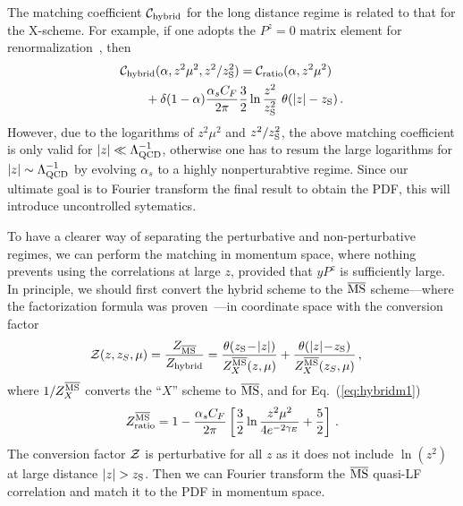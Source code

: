 \documentclass[preprint,12pt]{elsarticle}
\newcommand{\MS}{{\overline{\rm MS}}}
\newcommand{\nn}{\nonumber}
\DeclareRobustCommand{\eq}[1]{Eq.~(\ref{eq:#1})}
\begin{document}
The matching coefficient ${\cal C}_{\rm hybrid}$ for the long distance regime is related to that for the X-scheme. For example, if one adopts the $P^z=0$ matrix element for renormalization~\cite{Zhang:2018ggy,Radyushkin:2017lvu,Izubuchi:2018srq}, then
\begin{align}\label{eq:hybridm1}
&{\cal C}_{\rm hybrid}(\alpha, z^2\mu^2, z^2/z_{\rm S}^2) = {\cal C}_{\rm ratio}(\alpha, z^2\mu^2) \nn\\
&\qquad + \delta(1-\alpha){\alpha_sC_F\over 2\pi}{3\over 2} \ln {z^2\over z_{\rm S}^2}\ \theta(|z|-z_{\rm S})\,.
\end{align}
 However, due to the logarithms of $z^2\mu^2$ and $z^2/z_{\rm S}^2$, the above matching coefficient is only valid for $|z| \ll \Lambda_{\rm QCD}^{-1}$, otherwise one has to resum the large logarithms for $|z|\sim \Lambda_{\rm QCD}^{-1}$ by evolving $\alpha_s$ to a highly nonperturabtive regime. Since our ultimate goal is to Fourier transform the final result to obtain the PDF, this will introduce uncontrolled sytematics.

To have a clearer way of separating the perturbative and non-perturbative regimes, we can perform the matching in momentum space, where nothing prevents using the correlations at large $z$, provided that $yP^z$ is sufficiently large. In principle, we should first convert the hybrid scheme to the $\MS$ scheme---where the factorization formula was proven~\cite{Ma:2014jla,Ji:2020ect}---in coordinate space with the conversion factor
\begin{align}\label{eq:hybrid3}
    {\cal Z}(z,z_S,\mu) & = {Z_{\MS}\over Z_{\rm hybrid}} =\frac{\theta(z_{\rm S}\!-\!|z|)}{Z^{\overline{\rm MS}}_{X}(z,\mu)}
    +\frac{\theta(|z|\!-\! z_{\rm S})}{Z^{\overline{\rm MS}}_{X}(z_S,\mu)}\,,
\end{align}
where $1/Z^{\overline{\rm MS}}_{X}$ converts the ``$X$'' scheme to $\MS$, and for \eq{hybridm1}
\begin{align}\label{eq:zmsr}
    Z^{\overline{\rm MS}}_{\rm ratio} = 1 - {\alpha_sC_F\over 2\pi}\left[{3\over 2}\ln{z^2\mu^2\over 4e^{-2\gamma_E}}+ {5\over2}\right]\,.
\end{align}
The conversion factor ${\cal Z}$ is perturbative for all $z$ as it does not include $\ln(z^2)$ at large distance $|z|>z_{\rm S}$. Then we can Fourier transform the $\MS$ quasi-LF correlation and match it to the PDF in momentum space.
\end{document}
